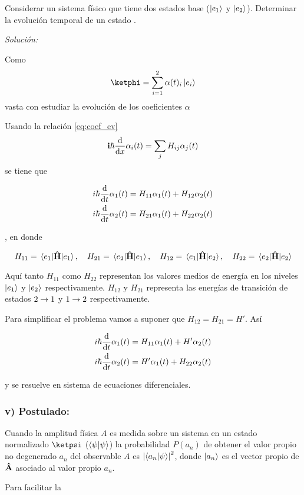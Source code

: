 \begin{example}
    Considerar un sistema físico que tiene dos estados base ($\ket{e_1}$ y $\ket{e_2}$). Determinar la evolución temporal de un estado \ketpsi.
    
    \textit{Solución:}
    
    Como
    $$
    \ketphi=\sum_{i=1}^2\alpha(t)_i\ket{e_i}
    $$
    vasta con estudiar la evolución de los coeficientes $\alpha$
    
    Usando la relación \autoref{eq:coef_ev}
    $$
    \vb{i}\hbar \dv{x} \alpha_i(t)=\sum_j H_{ij}\alpha_j(t) 
    $$
    se tiene que
    
    \begin{align*}
        &i\hbar\dv{t}\alpha_1(t)=H_{11}\alpha_1(t)+H_{12}\alpha_2(t)\\
        &i\hbar\dv{t}\alpha_2(t)=H_{21}\alpha_1(t)+H_{22}\alpha_2(t)
    \end{align*}
    
    , en donde
    
    $$
    H_{11}=\mel{e_1}{\vu{H}}{e_1}\qc H_{21}=\mel{e_2}{\vu{H}}{e_1}\qc H_{12}=\mel{e_1}{\vu{H}}{e_2}\qc H_{22}=\mel{e_2}{\vu{H}}{e_2}
    $$
    
    Aquí tanto $H_{11}$ como $H_{22}$ representan los valores medios de energía en los niveles $\ket{e_1}$ y $\ket{e_2}$ respectivamente. $H_{12}$ y $H_{21}$ representa las energías de transición de estados $2\rightarrow 1$ y $1\rightarrow 2$ respectivamente.
    
    Para simplificar el problema vamos a suponer que $H_{12}=H_{21}=H'$. Así
    
    \begin{align*}
        &i\hbar\dv{t}\alpha_1(t)=H_{11}\alpha_1(t)+H'\alpha_2(t)\\
        &i\hbar\dv{t}\alpha_2(t)=H'\alpha_1(t)+H_{22}\alpha_2(t)
    \end{align*}
    
    y se resuelve en sistema de ecuaciones diferenciales.
\end{example}

\subsubsection{v) Postulado:} Cuando la amplitud física $A$ es medida sobre un sistema en un estado normalizado $\ketpsi$ ($\braket{\psi}$) la probabilidad $P(a_n)$ de obtener el valor propio no degenerado $a_n$ del observable $A$ es $\abs{\braket{a_n}{\psi}}^2$, donde $\ket{a_n}$ es el vector propio de $\vu{A}$ asociado al valor propio $a_n$.

Para facilitar la